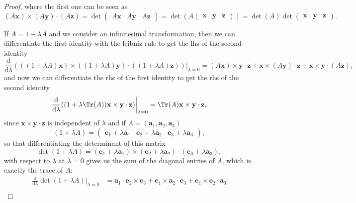 \begin{proof}
    where the first one can be seen as
    \[
        (A \mathbf{x}) \times (A \mathbf{y}) \cdot (A \mathbf{z}) = \det\begin{pmatrix}
            A\mathbf{x} & A\mathbf{y} & A\mathbf{z}
        \end{pmatrix} = \det (A \begin{pmatrix}
                \mathbf{x} & \mathbf{y} & \mathbf{z} \end{pmatrix}) = \det(A) \det\begin{pmatrix}
            \mathbf{x} & \mathbf{y} & \mathbf{z}
        \end{pmatrix}.
    \]

    If \(A = 1 + \lambda A\) and we consider an infinitesimal transformation, then we can differentiate the first identity with the leibniz rule to get the lhs of the second identity
    \[
        \frac{\mathrm{d}}{\mathrm{d} \lambda} (((1+\lambda A) \mathbf{x}) \times ((1 + \lambda A) \mathbf{y}) \cdot ((1+\lambda A) \mathbf{z})) \bigg|_{\lambda = 0} = (A \mathbf{x}) \times \mathbf{y} \cdot \mathbf{z} + \mathbf{x} \times (A \mathbf{y}) \cdot \mathbf{z} + \mathbf{x} \times \mathbf{y} \cdot (A \mathbf{z}),
    \]
    and now we can differentiate the rhs of the first identity to get the rhs of the second identity
    \[
        \frac{\mathrm{d}}{\mathrm{d} \lambda} ((1 + \lambda \Tr(A)) \mathbf{x} \times \mathbf{y} \cdot \mathbf{z}) \bigg|_{\lambda = 0} = \Tr(A) \mathbf{x} \times \mathbf{y} \cdot \mathbf{z},
    \]
    since \(\mathbf{x} \times \mathbf{y} \cdot \mathbf{z}\) is independent of \(\lambda\) and if \(A = (\mathbf{a}_1, \mathbf{a}_2, \mathbf{a}_3)\)
    \[
        (1+\lambda A) = \begin{pmatrix}
            \mathbf{e}_1 + \lambda \mathbf{a}_1 & \mathbf{e}_2 + \lambda \mathbf{a}_2 & \mathbf{e}_3 + \lambda \mathbf{a}_3
        \end{pmatrix},
    \]
    so that differentiating the determinant of this matrix
    \[
        \det(1 + \lambda A) = (\mathbf{e}_1 + \lambda \mathbf{a}_1) \times (\mathbf{e}_2 + \lambda \mathbf{a}_2) \cdot (\mathbf{e}_3 + \lambda \mathbf{a}_3),
    \]
    with respect to \(\lambda\) at \(\lambda = 0\) gives us the sum of the diagonal entries of \(A\), which is exactly the trace of \(A\):
    \[
        \begin{aligned}
            \frac{\mathrm{d}}{\mathrm{d} \lambda} \det(1 + \lambda A) \bigg|_{\lambda = 0} & = \mathbf{a}_1 \cdot \mathbf{e}_2 \times \mathbf{e}_3 + \mathbf{e}_1 \times \mathbf{a}_2 \cdot \mathbf{e}_3 + \mathbf{e}_1 \times \mathbf{e}_2 \cdot \mathbf{a}_3 \\

\end{aligned}\]
\end{proof}
